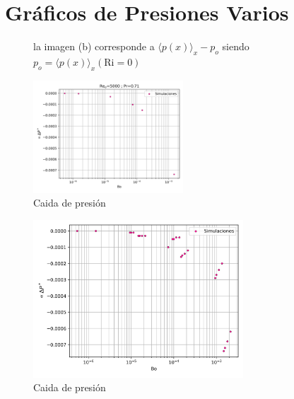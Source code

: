 \newpage
\section{Gráficos de Presiones Varios }

\begin{figure}[H]
  \centering
    
  \caption{la imagen (b) corresponde a $\langle p(x) \rangle_{x} - p_o$ siendo $p_o = \langle p(x) \rangle_{x}(\text{Ri}=0)$ }
  \label{fig:Re5000-Pr071-pressure}
\end{figure}

\begin{figure}[H]
  \centering
	\includegraphics[width=0.5\textwidth]{figures/cap5/Re5000-Pr071/DeltaP_vs_Bo_Re5000-Pr071.png}
  \caption{Caida de presión}
  \label{fig:darcy_vs_bo}
\end{figure}

\begin{figure}[H]
  \centering
    \includegraphics[width=0.7\textwidth]{figures/cap5/DeltaP_vs_Bo.png}
  \caption{Caida de presión}
  \label{fig:darcy_vs_bo}
\end{figure}